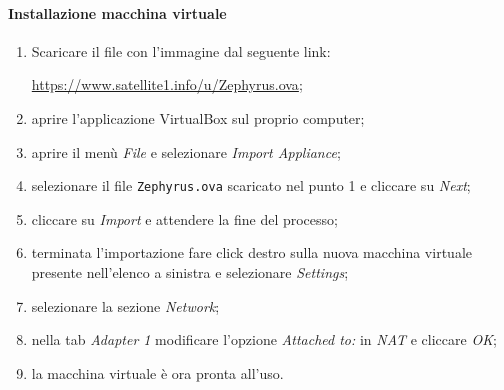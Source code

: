 	\paragraph{Installazione macchina virtuale}
	\begin{enumerate}
		\item Scaricare il file con l'immagine dal seguente link:\\ \centerline{\url{https://www.satellite1.info/u/Zephyrus.ova};}
		\item aprire l'applicazione VirtualBox sul proprio computer;
		\item aprire il menù \textit{File} e selezionare \textit{Import Appliance};
		\item selezionare il file \texttt{Zephyrus.ova} scaricato nel punto 1 e cliccare su \textit{Next};
		\item cliccare su \textit{Import} e attendere la fine del processo;
		\item terminata l'importazione fare click destro sulla nuova macchina virtuale presente nell'elenco a sinistra e selezionare \textit{Settings};
		\item selezionare la sezione \textit{Network};
		\item nella tab \textit{Adapter 1} modificare l'opzione \textit{Attached to:} in \textit{NAT} e cliccare \textit{OK};
		\item la macchina virtuale è ora pronta all'uso.
	\end{enumerate}

